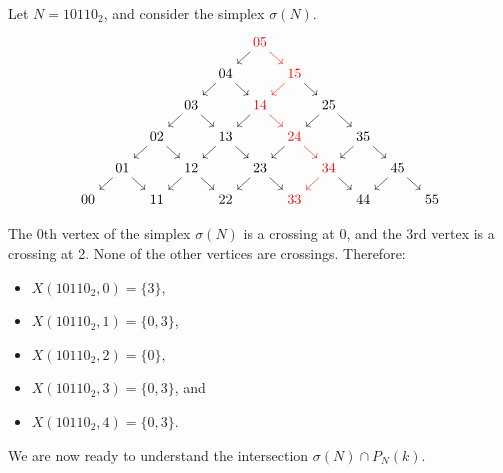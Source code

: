 \documentclass[main.tex]{subfiles}
\begin{document}
\begin{example}
  Let $N = 10110_{2}$, and consider the simplex $\sigma(N)$.
  \begin{equation*}
    \begin{tikzcd}[column sep=tiny, row sep=small]
      &&&&& \color{red}{05}
      \arrow[dl]
      \arrow[dr, red]
      \\
      &&&& 04
      \arrow[dl]
      \arrow[dr]
      && \color{red}{15}
      \arrow[dl, red]
      \arrow[dr]
      \\
      &&& 03
      \arrow[dl]
      \arrow[dr]
      && \color{red}{14}
      \arrow[dl]
      \arrow[dr, red]
      && 25
      \arrow[dl]
      \arrow[dr]
      \\
      && 02
      \arrow[dl]
      \arrow[dr]
      && 13
      \arrow[dl]
      \arrow[dr]
      && \color{red}{24}
      \arrow[dl]
      \arrow[dr, red]
      && 35
      \arrow[dl]
      \arrow[dr]
      \\
      & 01
      \arrow[dl]
      \arrow[dr]
      && 12
      \arrow[dl]
      \arrow[dr]
      && 23
      \arrow[dl]
      \arrow[dr]
      && \color{red}{34}
      \arrow[dl, red]
      \arrow[dr]
      && 45
      \arrow[dl]
      \arrow[dr]
      \\
      00
      && 11
      && 22
      && \color{red}{33}
      && 44
      && 55
    \end{tikzcd}
  \end{equation*}

  The 0th vertex of the simplex $\sigma(N)$ is a crossing at 0, and the 3rd vertex is a crossing at 2. None of the other vertices are crossings. Therefore:
  \begin{itemize}
    \item $X(10110_{2}, 0) = \{3\}$,

    \item $X(10110_{2}, 1) = \{0, 3\}$,

    \item $X(10110_{2}, 2) = \{0\}$,

    \item $X(10110_{2}, 3) = \{0, 3\}$, and

    \item $X(10110_{2}, 4) = \{0, 3\}$.
  \end{itemize}
\end{example}

We are now ready to understand the intersection $\sigma(N) \cap P_{N}(k)$.
\end{document}
